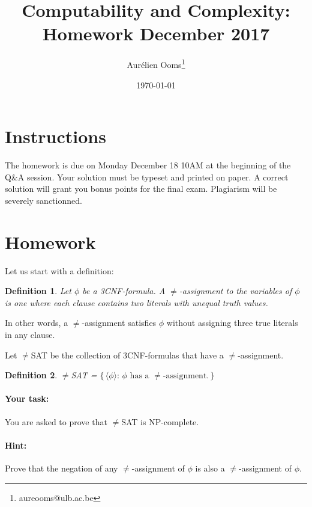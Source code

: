 \documentclass{article}
\title{Computability and Complexity:\\Homework December 2017}
\author{Aurélien Ooms\footnote{aureooms@ulb.ac.be}}
\date{\today}
\newcommand{\definitionname}{Definition}
\newtheorem{definition}{\definitionname}
\begin{document}
\maketitle
\section*{Instructions} The homework is due on Monday December 18 10AM at the
beginning of the Q\&A session. Your solution must be typeset and printed on
paper. A correct solution will grant you bonus points for the final exam.
Plagiarism will be severely sanctionned.

\section*{Homework}
Let us start with a definition:
\begin{definition}
  Let $\phi$ be a 3CNF-formula. A $\ne$-assignment to the variables of $\phi$
  is one where each clause contains two literals with unequal truth values.
\end{definition}
In other words, a $\ne$-assignment satisfies $\phi$ without assigning three
true literals in any clause.

Let $\ne$SAT be the collection of 3CNF-formulas that have a $\ne$-assignment.
\begin{definition}
  $\ne$SAT = $\{\,\langle \phi \rangle\colon\, \text{$\phi$ has a $\ne$-assignment.} \,\}$
\end{definition}

\paragraph{Your task:} You are asked to prove that $\ne$SAT is NP-complete.

\paragraph{Hint:} Prove that the negation of any $\ne$-assignment of $\phi$ is
also a $\ne$-assignment of $\phi$.
%
\end{document}

